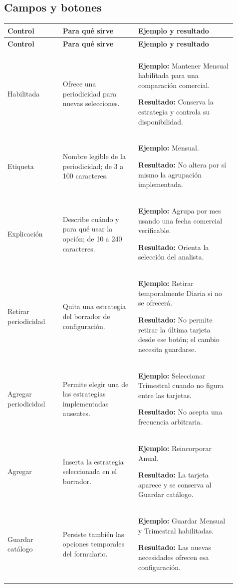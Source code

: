 \subsection{Campos y botones}
\begingroup
\fontsize{10}{12.5}\selectfont
\setlength{\tabcolsep}{5pt}
\renewcommand{\arraystretch}{1.15}
\begin{longtable}{@{}>{\RaggedRight\arraybackslash}p{0.22\linewidth}>{\RaggedRight\arraybackslash}p{0.3\linewidth}>{\RaggedRight\arraybackslash}p{0.39\linewidth}@{}}
\toprule
\textbf{Control} & \textbf{Para qué sirve} & \textbf{Ejemplo y resultado} \\
\midrule
\endfirsthead
\toprule
\textbf{Control} & \textbf{Para qué sirve} & \textbf{Ejemplo y resultado} \\
\midrule
\endhead
\midrule
\multicolumn{3}{r}{\footnotesize Continúa en la página siguiente}\\
\endfoot
\bottomrule
\endlastfoot
Habilitada & Ofrece una periodicidad para nuevas selecciones. & \textbf{Ejemplo:} Mantener Mensual habilitada para una comparación comercial.\par\smallskip\textbf{Resultado:} Conserva la estrategia y controla su disponibilidad. \\
\addlinespace[3pt]
Etiqueta & Nombre legible de la periodicidad; de 3 a 100 caracteres. & \textbf{Ejemplo:} Mensual.\par\smallskip\textbf{Resultado:} No altera por sí mismo la agrupación implementada. \\
\addlinespace[3pt]
Explicación & Describe cuándo y para qué usar la opción; de 10 a 240 caracteres. & \textbf{Ejemplo:} Agrupa por mes usando una fecha comercial verificable.\par\smallskip\textbf{Resultado:} Orienta la selección del analista. \\
\addlinespace[3pt]
Retirar periodicidad & Quita una estrategia del borrador de configuración. & \textbf{Ejemplo:} Retirar temporalmente Diaria si no se ofrecerá.\par\smallskip\textbf{Resultado:} No permite retirar la última tarjeta desde ese botón; el cambio necesita guardarse. \\
\addlinespace[3pt]
Agregar periodicidad & Permite elegir una de las estrategias implementadas ausentes. & \textbf{Ejemplo:} Seleccionar Trimestral cuando no figura entre las tarjetas.\par\smallskip\textbf{Resultado:} No acepta una frecuencia arbitraria. \\
\addlinespace[3pt]
Agregar & Inserta la estrategia seleccionada en el borrador. & \textbf{Ejemplo:} Reincorporar Anual.\par\smallskip\textbf{Resultado:} La tarjeta aparece y se conserva al Guardar catálogo. \\
\addlinespace[3pt]
Guardar catálogo & Persiste también las opciones temporales del formulario. & \textbf{Ejemplo:} Guardar Mensual y Trimestral habilitadas.\par\smallskip\textbf{Resultado:} Las nuevas necesidades ofrecen esa configuración. \\
\addlinespace[3pt]
\end{longtable}
\endgroup

